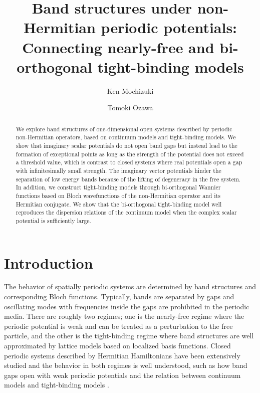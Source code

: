 \documentclass[prb,superscriptaddress,floatfix,twocolumn,showpacs]{revtex4-2}
\begin{document}
\title{Band structures under non-Hermitian periodic potentials:\\ Connecting nearly-free and bi-orthogonal tight-binding models}
\author{Ken Mochizuki}

\author{Tomoki Ozawa}

\begin{abstract}
We explore band structures of one-dimensional open systems described by periodic non-Hermitian operators, based on continuum models and tight-binding models. 
We show that imaginary scalar potentials do not open band gaps but instead lead to the formation of exceptional points as long as the strength of the potential does not exceed a threshold value, which is contrast to closed systems where real potentials open a gap with infinitesimally small strength. 
The imaginary vector potentials hinder the separation of low energy bands because of the lifting of degeneracy in the free system.  
In addition, we construct tight-binding models through bi-orthogonal Wannier functions based on Bloch wavefunctions of the non-Hermitian operator and its Hermitian conjugate. 
We show that the bi-orthogonal tight-binding model well reproduces the dispersion relations of the continuum model when the complex scalar potential is sufficiently large.
\end{abstract}

\maketitle

\section{Introduction}
\label{sec:introduction}
The behavior of spatially periodic systems are determined by band structures and corresponding Bloch functions. 
Typically, bands are separated by gaps and oscillating modes with frequencies inside the gaps are prohibited in the periodic media. 
There are roughly two regimes; one is the nearly-free regime where the periodic potential is weak and can be treated as a perturbation to the free particle, and the other is the tight-binding regime where band structures are well approximated by lattice models based on localized basis functions. 
Closed periodic systems described by Hermitian Hamiltonians have been extensively studied and the behavior in both regimes is well understood, such as how band gaps open with weak periodic potentials and the relation between continuum models and tight-binding models \cite{ashcroft1976solid,
marzani1997maximally,
souza2001maximally,
marzani2012maximally}. 
\end{document}
